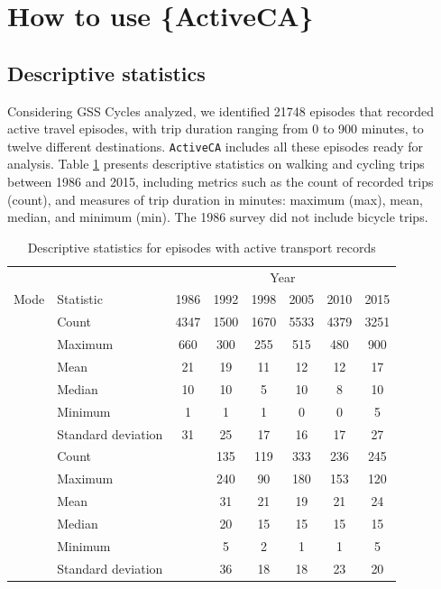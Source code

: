 \documentclass[Royal,times,sageh]{sagej}
\begin{document}
\section{How to use \{ActiveCA\}}\label{how-to-use-activeca}

\subsection{Descriptive statistics}\label{descriptive-statistics}

Considering GSS Cycles analyzed, we identified 21748 episodes that
recorded active travel episodes, with trip duration ranging from 0 to
900 minutes, to twelve different destinations. \texttt{ActiveCA}
includes all these episodes ready for analysis. Table \ref{tab:table-01}
presents descriptive statistics on walking and cycling trips between
1986 and 2015, including metrics such as the count of recorded trips
(count), and measures of trip duration in minutes: maximum (max), mean,
median, and minimum (min). The 1986 survey did not include bicycle
trips.

\begingroup\fontsize{10}{12}\selectfont

\begin{longtable}[t]{>{}llcccccc}
\caption{\label{tab:table-01}\label{tab:table-01}Descriptive statistics for episodes with active transport records}\\
\toprule
\multicolumn{2}{c}{ } & \multicolumn{6}{c}{Year} \\
\cmidrule(l{3pt}r{3pt}){3-8}
Mode & Statistic & 1986 & 1992 & 1998 & 2005 & 2010 & 2015\\
\midrule
 & Count & 4347 & 1500 & 1670 & 5533 & 4379 & 3251\\
\nopagebreak
 & Maximum & 660 & 300 & 255 & 515 & 480 & 900\\
\nopagebreak
 & Mean & 21 & 19 & 11 & 12 & 12 & 17\\
\nopagebreak
 & Median & 10 & 10 & 5 & 10 & 8 & 10\\
\nopagebreak
 & Minimum & 1 & 1 & 1 & 0 & 0 & 5\\
\nopagebreak
\multirow[t]{-6}{*}{\raggedright\arraybackslash \textbf{Walking}} & Standard deviation & 31 & 25 & 17 & 16 & 17 & 27\\
\cmidrule{1-8}\pagebreak[0]
 & Count &  & 135 & 119 & 333 & 236 & 245\\
\nopagebreak
 & Maximum &  & 240 & 90 & 180 & 153 & 120\\
\nopagebreak
 & Mean &  & 31 & 21 & 19 & 21 & 24\\
\nopagebreak
 & Median &  & 20 & 15 & 15 & 15 & 15\\
\nopagebreak
 & Minimum &  & 5 & 2 & 1 & 1 & 5\\
\nopagebreak
\multirow[t]{-6}{*}{\raggedright\arraybackslash \textbf{Cycling}} & Standard deviation &  & 36 & 18 & 18 & 23 & 20\\
\bottomrule
\end{longtable}
\endgroup{}
\end{document}
